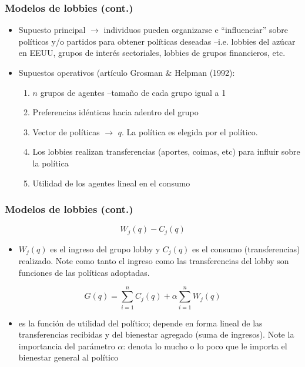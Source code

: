 \documentclass[14pt,aspectratio=169]{beamer}
\begin{document}
\begin{frame}
\frametitle{Modelos de lobbies (cont.)}
\begin{itemize}
\itemsep 10pt
\item Supuesto principal $\longrightarrow$ individuos pueden organizarse e ``influenciar'' sobre políticos y/o partidos para obtener políticas deseadas --i.e. lobbies del azúcar en EEUU, grupos de interés sectoriales, lobbies de grupos financieros, etc.
\item Supuestos operativos (artículo Grosman \& Helpman (1992):
\begin{enumerate}
\item $n$ grupos de agentes --tamaño de cada grupo igual a 1
\item Preferencias idénticas hacia adentro del grupo
\item Vector de políticas $\longrightarrow$ $q$. La política es elegida por el político.
\item Los lobbies realizan transferencias (aportes, coimas, etc) para influir sobre la política
\item Utilidad de los agentes lineal en el consumo
\end{enumerate}
\end{itemize}
\end{frame}


\begin{frame}
\frametitle{Modelos de lobbies (cont.)}
\begin{equation}
W_j(q)-C_j(q)
\end{equation}
\begin{itemize}
\item $W_j(q)$ es el ingreso del grupo lobby y $C_j(q)$ es el consumo (transferencias) realizado. Note como tanto el ingreso como las transferencias del lobby son funciones de las políticas adoptadas.
\end{itemize}
\begin{equation}
G(q)=\sum_{i=1}^n C_j(q)+\alpha \sum_{i=1}^n W_j(q)
\end{equation}
\begin{itemize}
\item es la función de utilidad del político; depende en forma lineal de las transferencias recibidas y del bienestar agregado (suma de ingresos). Note la importancia del parámetro $\alpha$: denota lo mucho o lo poco que le importa el bienestar general al político
\end{itemize}
\end{frame}
\end{document}
